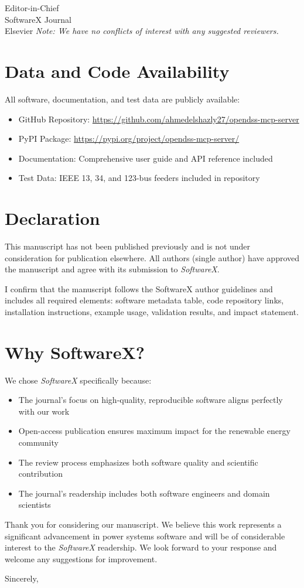 \documentclass[11pt]{letter}
\begin{document}
\begin{letter}{
Editor-in-Chief\\
SoftwareX Journal\\
Elsevier
}
\textit{Note: We have no conflicts of interest with any suggested reviewers.}

\section*{Data and Code Availability}

All software, documentation, and test data are publicly available:
\begin{itemize}
    \item GitHub Repository: \url{https://github.com/ahmedelshazly27/opendss-mcp-server}
    \item PyPI Package: \url{https://pypi.org/project/opendss-mcp-server/}
    \item Documentation: Comprehensive user guide and API reference included
    \item Test Data: IEEE 13, 34, and 123-bus feeders included in repository
\end{itemize}

\section*{Declaration}

This manuscript has not been published previously and is not under consideration for publication elsewhere. All authors (single author) have approved the manuscript and agree with its submission to \textit{SoftwareX}.

I confirm that the manuscript follows the SoftwareX author guidelines and includes all required elements: software metadata table, code repository links, installation instructions, example usage, validation results, and impact statement.

\section*{Why SoftwareX?}

We chose \textit{SoftwareX} specifically because:
\begin{itemize}
    \item The journal's focus on high-quality, reproducible software aligns perfectly with our work
    \item Open-access publication ensures maximum impact for the renewable energy community
    \item The review process emphasizes both software quality and scientific contribution
    \item The journal's readership includes both software engineers and domain scientists
\end{itemize}

Thank you for considering our manuscript. We believe this work represents a significant advancement in power systems software and will be of considerable interest to the \textit{SoftwareX} readership. We look forward to your response and welcome any suggestions for improvement.

\closing{Sincerely,}

\end{letter}
\end{document}
